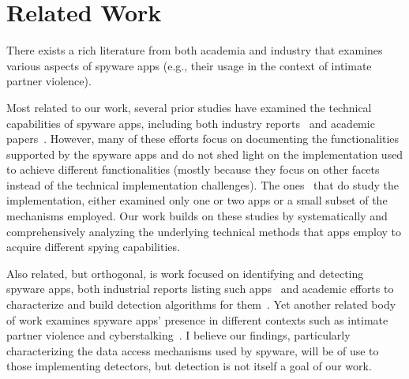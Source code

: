 
\section{Related Work}
\label{sec:related_work}
There exists a rich literature from both academia and industry that
examines various aspects of spyware apps (e.g., their usage in the
context of intimate partner violence).

Most related to our work, several prior studies have examined
the technical capabilities of spyware apps, including
both industry reports~\cite{PowerPoi79:online, SpyvsSpy59:online,
  ANewWave1:online, Whyyoush17:online, ReverseE12:online,
  YourInfo19:online, Stalking85:online, FlexSpyA1:online,
  diskurse89:online, VB2019Za6:online, SpywareP46:online, Androida91:online} and academic
papers~\cite{parsons2019predator, harkin2019consumer,
  harkin2020commodification, pierazzi2020data,
  feal2020angel,harkin2021operating}. However, many of these
efforts focus on documenting the functionalities supported by the
spyware apps and do not shed light on the implementation used to achieve
different functionalities (mostly because they focus on other facets instead
of the technical implementation challenges). The ones~\cite{Whyyoush17:online,ReverseE12:online,Stalking85:online,FlexSpyA1:online,diskurse89:online,VB2019Za6:online,parsons2019predator} that do study the implementation,
either examined only one or two apps or a small subset of the
mechanisms employed. Our work builds on these studies by systematically and comprehensively analyzing the underlying technical methods that apps employ to acquire different spying capabilities.

Also related, but orthogonal, is work focused on identifying and
detecting spyware apps, both industrial reports listing such
apps~\cite{Tekstalk86:online, esetandr4:online, ch33r10S37:online} and
academic efforts to characterize and build detection algorithms for
them~\cite{almansoori2022global,pierazzi2020data, chatterjee2018spyware, han2021towards,
  saroiu2004measurement, egele2007dynamic, roundy2020many,
  wang2006netspy, moshchuk2006crawler, randall2020trufflehunter}.  Yet
another related body of work examines spyware apps' presence in
different contexts such as intimate partner violence and
cyberstalking~\cite{havron2019clinical,freed2019my,tseng2020tools,thomas2021sok,freed2018stalker,fraser2010new,
  shimizu2013domestic,woodlock2017abuse,southworth2005high,southworth2006technology,dragiewicz2019domestic,mayrhofer2021android,motherboardstalkerwaremarket}.
I believe our findings, particularly characterizing the data access
mechanisms used by spyware, will be of use to those implementing
detectors, but detection is not itself a goal of our work.


